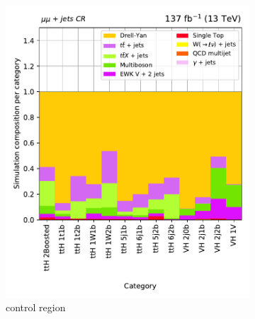 \begin{figure}[htbp]
    \begin{subfigure}[b]{0.32\textwidth}
        \includegraphics[width=\textwidth]{figures/region_plots/full_Run2/region_2/background_composition.pdf}
        \caption{\doubleMuCr control region}
    \end{subfigure}
    \hfill
    \begin{subfigure}[b]{0.32\textwidth}

\end{subfigure}
\end{figure}
